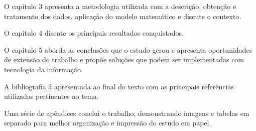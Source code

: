 O capítulo 3 apresenta a metodologia utilizada com a descrição, obtenção e tratamento dos dados, aplicação do modelo matemático e discute o contexto.

O capítulo 4 discute os principais resultados conquistados.

O capítulo 5 aborda as conclusões que o estudo gerou e apresenta oportunidades de extensão do trabalho e propõe soluções que podem ser implementadas com tecnologia da informação.

A bibliografia á apresentada ao final do texto com as principais referências utilizadas pertinentes ao tema.

Uma série de apêndices conclui o trabalho, demonstrando imagens e tabelas em separado para melhor organização e impressão do estudo em papel.

